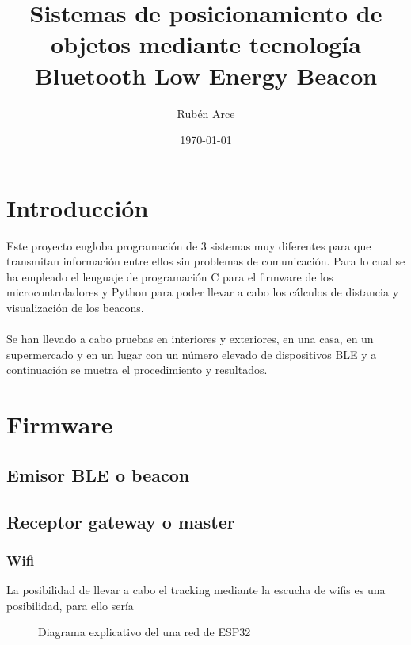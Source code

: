 \documentclass[a4paper ,12pt, onecolumn]{article}
\begin{document}
\pagestyle{fancy}
\title{Sistemas de posicionamiento de objetos mediante tecnología Bluetooth Low Energy Beacon }
\author{Rubén Arce}
\date{\today}
\maketitle
\cleardoublepage
\tableofcontents
\listoffigures
\cleardoublepage
\section{Introducción}
    Este proyecto engloba programación de 3 sistemas muy diferentes para que transmitan información entre ellos 
    sin problemas de comunicación. Para lo cual se ha empleado el lenguaje de programación C para el firmware de los 
    microcontroladores y Python para poder llevar a cabo los cálculos de distancia y visualización de los beacons.
    \paragraph{}
    Se han llevado a cabo pruebas en interiores y exteriores, en una casa, en un supermercado y en un lugar con un número elevado de dispositivos BLE y
    a continuación se muetra el procedimiento y resultados.
\section{Firmware}
    \subsection{Emisor BLE o beacon}
    \subsection{Receptor gateway o master}

        \subsubsection {Wifi}
            La posibilidad de llevar a cabo el tracking mediante la escucha de wifis es una posibilidad, para ello sería

   
            \begin{center}
                \begin{figure}[ht]
                    \centering

                    \caption{Diagrama explicativo del una red de ESP32}
                    \label{fig:mesh4}
                \end{figure}
            \end{center}
       
\end{document}
